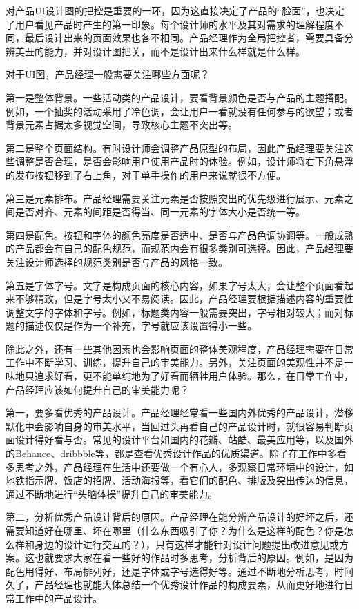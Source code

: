 \documentclass[letterpaper,11pt,english]{sphinxmanual}
\begin{document}
对产品UI设计图的把控是重要的一环，因为这直接决定了产品的“脸面”，也决定了用户看见产品时产生的第一印象。每个设计师的水平及其对需求的理解程度不同，最后设计出来的页面效果也各不相同。产品经理作为全局把控者，需要具备分辨美丑的能力，并对设计图把关，而不是设计出来什么样就是什么样。

对于UI图，产品经理一般需要关注哪些方面呢？

第一是整体背景。一些活动类的产品设计，要看背景颜色是否与产品的主题搭配。例如，一个抽奖的活动采用了冷色调，会让用户一看就没有任何参与的欲望；或者背景元素占据太多视觉空间，导致核心主题不突出等。

第二是整个页面结构。有时设计师会调整产品原型的布局，因此产品经理要关注这些调整是否合理，是否会影响用户使用产品时的体验。例如，设计师将右下角悬浮的发布按钮移到了右上角，对于单手操作的用户来说就很不方便。

第三是元素排布。产品经理需要关注元素是否按照突出的优先级进行展示、元素之间是否对齐、元素的间距是否得当、同一元素的字体大小是否统一等。

第四是配色。按钮和字体的颜色亮度是否适中、是否与产品色调协调等。一般成熟的产品都会有自己的配色规范，而规范内会有很多类别可选择。因此，产品经理要关注设计师选择的规范类别是否与产品的风格一致。

第五是字体字号。文字是构成页面的核心内容，如果字号太大，会让整个页面看起来不够精致，但是字号太小又不易阅读。因此，产品经理要根据描述内容的重要性调整文字的字体和字号。例如，标题类内容一般需要突出，字号相对较大；而对标题的描述仅仅是作为一个补充，字号就应该设置得小一些。

除此之外，还有一些其他因素也会影响页面的整体美观程度，产品经理需要在日常工作中不断学习、训练，提升自己的审美能力。另外，关注页面的美观性并不是一味地只追求好看，更不能单纯地为了好看而牺牲用户体验。那么，在日常工作中，产品经理应该如何提升自己的审美能力呢？

第一，要多看优秀的产品设计。产品经理经常看一些国内外优秀的产品设计，潜移默化中会影响自身的审美水平，当回过头再看自己的产品设计时，就很容易判断页面设计得好看与否。常见的设计平台如国内的花瓣、站酷、最美应用等，以及国外的Behance、dribbble等，都是查看优秀设计作品的优质渠道。除了在工作中多看多思考之外，产品经理在生活中还要做一个有心人，多观察日常环境中的设计，如地铁指示牌、饭店的招牌、活动海报等，看它们的配色、排版及突出传达的信息，通过不断地进行“头脑体操”提升自己的审美能力。

第二，分析优秀产品设计背后的原因。产品经理在能分辨产品设计的好坏之后，还需要知道好在哪里、坏在哪里（什么东西吸引了你？为什么是这样的配色？你是怎么样和身边的设计进行交互的？），只有这样才能针对设计问题提出改进意见或方案。这也就要求大家在看一些好的作品时多思考，分析背后的原因。例如，是因为配色用得好、布局排列好，还是字体或字号选得好等。通过不断地分析思考，时间久了，产品经理也就能大体总结一个优秀设计作品的构成要素，从而更好地进行日常工作中的产品设计。
\end{document}

